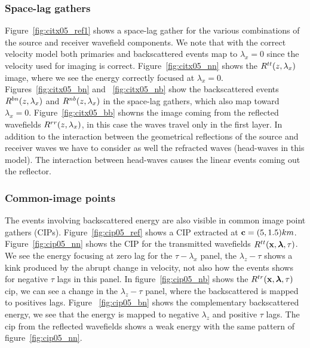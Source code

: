 \subsubsection{Space-lag gathers}

Figure~\ref{fig:citx05_ref1} shows a space-lag gather for the various combinations of the source and receiver wavefield components. 
We note that with the correct velocity model both primaries and backscattered events map to $\lambda_x=0$ since the velocity used for 
imaging is correct. 
%
Figure~\ref{fig:citx05_nn} shows the $R^{tt}(z,\lambda_x)$ image, where we see the energy correctly focused at $\lambda_x=0$. 
Figures~\ref{fig:citx05_bn} and ~\ref{fig:citx05_nb} show the backscattered events $R^{bn}(z,\lambda_x)$ and $R^{nb}(z,\lambda_x)$ in the space-lag gathers, 
which also map toward $\lambda_x=0$.
%
Figure~\ref{fig:citx05_bb} showns the image coming from the reflected wavefields $R^{rr}(z,\lambda_x)$, in this case the waves travel only in the first layer.
In addition to the interaction between the geometrical reflections of the source and receiver waves we have to consider as well 
the refracted waves (head-waves in this model). The interaction between head-waves causes the linear events coming out the reflector.  

\subsubsection{Common-image points}

The events involving backscattered energy are also visible in common image point gathers (CIPs).
%
Figure~\ref{fig:cip05_ref} shows a CIP extracted at ${\bf c}=(5,1.5)km$.
Figure~\ref{fig:cip05_nn} shows the CIP for the transmitted wavefields $R^{tt}({\bf x},{\boldsymbol{\lambda}},\tau)$. We see the energy focusing at zero lag 
for the $\tau-\lambda_x$ panel, the $\lambda_z-\tau$ shows a kink produced by the abrupt change in velocity, not also how the events
shows for negative $\tau$ lags in this panel.  In figure~\ref{fig:cip05_nb}
 shows the $R^{tr}({\bf x},{\boldsymbol{\lambda}},\tau)$ cip, we can see a change in the $\lambda_z-\tau$ panel, where the backscattered is mapped to positives lags. Figure
~\ref{fig:cip05_bn} shows the complementary backscattered energy, we see that the energy is mapped to negative $\lambda_z$ and positive $\tau$ lags.
The cip from the reflected wavefields shows a weak energy with the same pattern of figure~\ref{fig:cip05_nn}.







